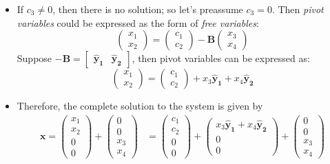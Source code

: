 \begin{itemize}
\item
If $c_3\ne 0$, then there is no solution; so let's preassume $c_3=0$. Then \textit{pivot variables} could be expressed as the form of \textit{free variables}:
\[
\begin{pmatrix}
x_1\\x_2
\end{pmatrix} = \begin{pmatrix}
c_1\\c_2
\end{pmatrix} - \bm B\begin{pmatrix}
x_3\\x_4
\end{pmatrix}
\]
Suppose $-\bm B = \begin{bmatrix}
\bm{\hat y_1}&\bm{\hat y_2}
\end{bmatrix}$, then pivot variables can be expressed as:
\[
\begin{pmatrix}
x_1\\x_2
\end{pmatrix} = \begin{pmatrix}
c_1\\c_2
\end{pmatrix}+x_3\bm{\hat y_1} + x_4\bm{\hat y_2}
\]
\item
Therefore, the complete solution to the system is given by
\begin{align}
\bm x=\begin{pmatrix}
x_1\\x_2\\0\\0
\end{pmatrix}
+
\begin{pmatrix}
0\\0\\x_3\\x_4
\end{pmatrix}
 &= \begin{pmatrix}
c_1\\c_2\\0\\0
\end{pmatrix} +  \begin{pmatrix}
x_3\bm{\hat y_1} + x_4\bm{\hat y_2}\\0\\0
\end{pmatrix} + \begin{pmatrix}
0\\0\\x_3\\x_4
\end{pmatrix}\\

\end{align}
\end{itemize}
